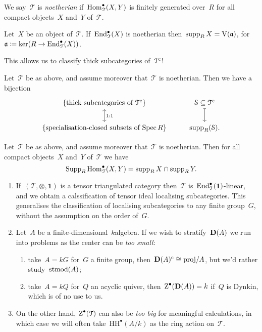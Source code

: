 \documentclass[10pt,a4paper]{article}
\begin{document}
We say~$\mathcal{T}$ is \emph{noetherian} if~$\operatorname{Hom}_{\mathcal{T}}^\bullet(X,Y)$ is finitely generated over~$R$ for all compact objects~$X$ and~$Y$ of~$\mathcal{T}$.
\begin{lemma}
  Let~$X$ be an object of~$\mathcal{T}$. If~$\operatorname{End}_{\mathcal{T}}^\bullet(X)$ is noetherian then~$\operatorname{supp}_R X=\operatorname{V}(\mathfrak{a})$, for~$\mathfrak{a}\coloneqq\ker(R\to\operatorname{End}_{\mathcal{T}}^\bullet(X))$.
\end{lemma}
This allows us to classify thick subcategories of~$\mathcal{T}^{\mathrm{c}}$!
\begin{theorem}
  Let~$\mathcal{T}$ be as above, and assume moreover that~$\mathcal{T}$ is noetherian. Then we have a bijection
  \begin{equation}
    \begin{tikzcd}
      \left\{ \text{thick subcategories of~$\mathcal{T}^\cc$} \right\} \arrow[leftrightarrow]{d}{1:1} & \mathcal{S}\subseteq\mathcal{T}^\cc \arrow[mapsto]{d} \\
      \left\{ \text{specialisation-closed subsets of $\Spec R$} \right\} & \supp_R(\mathcal{S}).
    \end{tikzcd}
  \end{equation}
\end{theorem}
\begin{corollary}
  Let~$\mathcal{T}$ be as above, and assume moreover that~$\mathcal{T}$ is noetherian. Then for all compact objects~$X$ and~$Y$ of~$\mathcal{T}$ we have
  \begin{equation}
    \operatorname{Supp}_R\operatorname{Hom}_{\mathcal{T}}^\bullet(X,Y)=\operatorname{supp}_R X\cap\operatorname{supp}_R Y.
  \end{equation}
\end{corollary}

\begin{example}
  \begin{enumerate}
    \item If~$(\mathcal{T},\otimes,\mathbf{1})$ is a tensor triangulated category then~$\mathcal{T}$ is~$\operatorname{End}_{\mathcal{T}}^\bullet(\mathbf{1})$-linear, and we obtain a calssification of tensor ideal localising subcategories. This generalises the classification of localising subcategories to any finite group~$G$, without the assumption on the order of~$G$.
    \item Let~$A$ be a finite-dimensional~$k$\dash algebra. If we wish to stratify~$\mathbf{D}(A)$ we run into problems as the center can be \emph{too small}:
      \begin{enumerate}
        \item take~$A=kG$ for~$G$ a finite group, then~$\mathbf{D}(A)^{\mathrm{c}}\cong\mathrm{proj}/A$, but we'd rather study~$\operatorname{stmod}(A)$;
        \item take~$A=kQ$ for~$Q$ an acyclic quiver, then~$\operatorname{Z}^\bullet(\mathbf{D}(A))=k$ if~$Q$ is Dynkin, which is of no use to us.
      \end{enumerate}
    \item On the other hand, $\operatorname{Z}^\bullet(\mathcal{T})$ can also be \emph{too big} for meaningful calculations, in which case we will often take~$\mathrm{HH}^\bullet(A/k)$ as the ring action on~$\mathcal{T}$.
  \end{enumerate}
\end{example}
\end{document}
